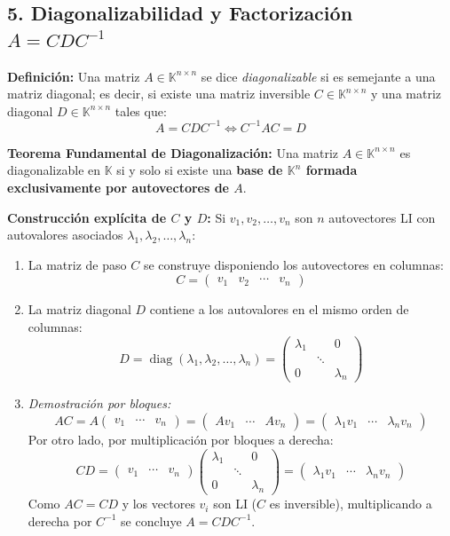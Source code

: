 \documentclass[11pt,a4paper]{article}
\begin{document}
\subsection*{5. Diagonalizabilidad y Factorización $A = C D C^{-1}$}

\textbf{Definición:} Una matriz $A \in \mathbb{K}^{n \times n}$ se dice \emph{diagonalizable} si es semejante a una matriz diagonal; es decir, si existe una matriz inversible $C \in \mathbb{K}^{n \times n}$ y una matriz diagonal $D \in \mathbb{K}^{n \times n}$ tales que:
\[
A = C D C^{-1} \iff C^{-1} A C = D
\]

\textbf{Teorema Fundamental de Diagonalización:}
Una matriz $A \in \mathbb{K}^{n \times n}$ es diagonalizable en $\mathbb{K}$ si y solo si existe una \textbf{base de $\mathbb{K}^n$ formada exclusivamente por autovectores de $A$}.

\vspace{0.4em}
\noindent
\textbf{Construcción explícita de $C$ y $D$:}
Si $v_1, v_2, \dots, v_n$ son $n$ autovectores LI con autovalores asociados $\lambda_1, \lambda_2, \dots, \lambda_n$:
\begin{enumerate}
    \item La matriz de paso $C$ se construye disponiendo los autovectores en columnas:
    \[
    C = \begin{pmatrix} v_1 & v_2 & \cdots & v_n \end{pmatrix}
    \]
    \item La matriz diagonal $D$ contiene a los autovalores en el mismo orden de columnas:
    \[
    D = \operatorname{diag}(\lambda_1, \lambda_2, \dots, \lambda_n) = \begin{pmatrix}
    \lambda_1 & & 0 \\
    & \ddots & \\
    0 & & \lambda_n
    \end{pmatrix}
    \]
    \item \emph{Demostración por bloques:}
    \[
    A C = A \begin{pmatrix} v_1 & \cdots & v_n \end{pmatrix} = \begin{pmatrix} A v_1 & \cdots & A v_n \end{pmatrix} = \begin{pmatrix} \lambda_1 v_1 & \cdots & \lambda_n v_n \end{pmatrix}
    \]
    Por otro lado, por multiplicación por bloques a derecha:
    \[
    C D = \begin{pmatrix} v_1 & \cdots & v_n \end{pmatrix} \begin{pmatrix} \lambda_1 & & 0 \\ & \ddots & \\ 0 & & \lambda_n \end{pmatrix} = \begin{pmatrix} \lambda_1 v_1 & \cdots & \lambda_n v_n \end{pmatrix}
    \]
    Como $A C = C D$ y los vectores $v_i$ son LI ($C$ es inversible), multiplicando a derecha por $C^{-1}$ se concluye $A = C D C^{-1}$.
\end{enumerate}
\end{document}
